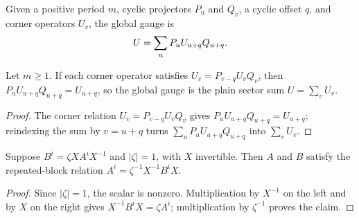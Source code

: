 \begin{definition}
    \label{def:periodic_global_gauge}
    \leanok
    Given a positive period $m$, cyclic projectors $P_u$ and $Q_v$, a cyclic
    offset $q$, and corner operators $U_v$, the global gauge is
    \begin{align}
        U=\sum_uP_uU_{u+q}Q_{u+q}. \notag
    \end{align}
\end{definition}

\begin{lemma}
    \label{lem:periodic_global_gauge_eq_sum}
    \leanok
    Let $m\ge1$. If each corner operator satisfies
    $U_v=P_{v-q}U_vQ_v$, then $P_uU_{u+q}Q_{u+q}=U_{u+q}$, so the global
    gauge is the plain sector sum $U=\sum_vU_v$.
\end{lemma}

\begin{proof}\leanok
    The corner relation $U_v=P_{v-q}U_vQ_v$ gives
    $P_uU_{u+q}Q_{u+q}=U_{u+q}$; reindexing the sum by $v=u+q$ turns
    $\sum_uP_uU_{u+q}Q_{u+q}$ into $\sum_vU_v$.
\end{proof}

\begin{lemma}
    \label{lem:gauge_phase_data_repeated_blocks}
    \leanok
    Suppose $B^i=\zeta XA^iX^{-1}$ and $|\zeta|=1$, with $X$ invertible.
    Then $A$ and $B$ satisfy the repeated-block relation
    $A^i=\zeta^{-1}X^{-1}B^iX$.
\end{lemma}
\begin{proof}\leanok
    Since $|\zeta|=1$, the scalar is nonzero. Multiplication by $X^{-1}$ on
    the left and by $X$ on the right gives
    $X^{-1}B^iX=\zeta A^i$; multiplication by $\zeta^{-1}$ proves the claim.
\end{proof}


